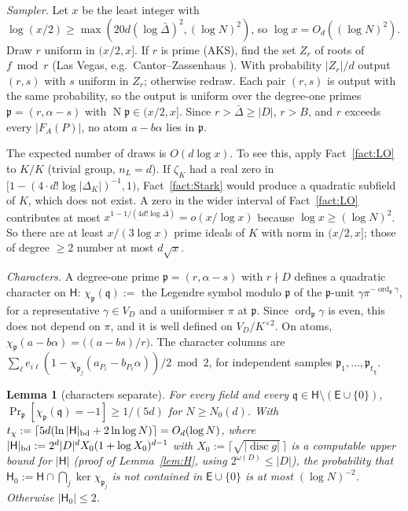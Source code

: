 \documentclass[11pt]{amsart}
\newtheorem{lemma}[theorem]{Lemma}
\theoremstyle{definition}
\newcommand{\sH}{\mathsf{H}}
\newcommand{\fq}{\mathfrak{q}}
\newcommand{\fp}{\mathfrak{p}}
\newcommand{\Prob}{\Pr}
\newcommand{\ord}{\operatorname{ord}}
\newcommand{\disc}{\operatorname{disc}}
\newcommand{\Norm}{\operatorname{N}}
\begin{document}
\emph{Sampler.} Let $x$ be the least integer with $\log(x/2)\ge\max(20d(\log\bar\Delta)^2,(\log N)^2)$, so $\log x=O_d((\log N)^2)$. Draw $r$
uniform in $(x/2,x]$. If $r$ is prime (AKS), find the set $Z_r$ of roots of $f\bmod r$ (Las Vegas, e.g.\ Cantor--Zassenhaus
\cite{cantorzassenhaus1981}). With probability $|Z_r|/d$ output $(r,s)$ with $s$ uniform in $Z_r$; otherwise redraw. Each pair $(r,s)$ is output with the same
probability, so the output is uniform over the degree-one primes $\fp=(r,\alpha-s)$ with $\Norm\fp\in(x/2,x]$. Since $r>\bar\Delta\ge|D|$, $r>B$, and
$r$ exceeds every $|F_A(P)|$, no atom $a-b\alpha$ lies in $\fp$.

The expected number of draws is $O(d\log x)$. To see this, apply Fact~\ref{fact:LO} to $K/K$ (trivial group, $n_L=d$). If $\zeta_K$ had a real zero in
$[1-(4\cdot d!\log|\Delta_K|)^{-1},1)$, Fact~\ref{fact:Stark} would produce a quadratic subfield of $K$, which does not exist. A zero in the wider
interval of Fact~\ref{fact:LO} contributes at most $x^{1-1/(4d!\log\bar\Delta)}=o(x/\log x)$ because $\log x\ge(\log N)^2$. So there are at least
$x/(3\log x)$ prime ideals of $K$ with norm in $(x/2,x]$; those of degree $\ge2$ number at most $d\sqrt x$.

\emph{Characters.} A degree-one prime $\fp=(r,\alpha-s)$ with $r\nmid D$ defines a quadratic character on $\sH$: $\chi_\fp(\fq):=$ the
Legendre symbol modulo $\fp$ of the $\fp$-unit $\gamma\pi^{-\ord_\fp\gamma}$, for a representative $\gamma\in V_D$ and a uniformiser $\pi$ at $\fp$. Since
$\ord_\fp\gamma$ is even, this does not depend on $\pi$, and it is well defined on $V_D/K^{\times2}$.
On atoms, $\chi_\fp(a-b\alpha)=\bigl((a-bs)/r\bigr)$. The character columns are $\sum_\ell e_{i\ell}(1-\chi_{\fp_j}(a_{P_\ell}-b_{P_\ell}\alpha))/2\bmod2$,
for independent samples $\fp_1,\dots,\fp_{t_\chi}$.

\begin{lemma}[characters separate]\label{lem:X}
For every field and every $\fq\in\sH\setminus(\mathsf E\cup\{0\})$, $\Prob_\fp[\chi_\fp(\fq)=-1]\ge1/(5d)$ for $N\ge N_0(d)$. With
$t_\chi:=\lceil5d(\ln|\sH|_{\rm bd}+2\ln\log N)\rceil=O_d(\log N)$, where $|\sH|_{\rm bd}:=2^d|D|^dX_0(1+\log X_0)^{d-1}$ with $X_0:=\lceil\sqrt{|\disc g|}\,\rceil$ is a
computable upper bound for $|\sH|$ (proof of Lemma~\ref{lem:H}, using $2^{\omega(D)}\le|D|$), the probability that
$\sH_0:=\sH\cap\bigcap_j\ker\chi_{\fp_j}$ is not contained in $\mathsf E\cup\{0\}$ is at most $(\log N)^{-2}$. Otherwise $|\sH_0|\le2$.
\end{lemma}
\end{document}
